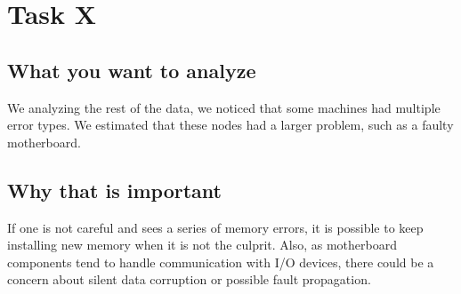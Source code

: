 \section{Task X}
\subsection{What you want to analyze}
We analyzing the rest of the data, we noticed that some machines had multiple
error types.  We estimated that these nodes had a larger problem, such as a
faulty motherboard.

\subsection{Why that is important}
If one is not careful and sees a series of memory errors, it is possible to keep
installing new memory when it is not the culprit.  Also, as motherboard
components tend to handle communication with I/O devices, there could be a
concern about silent data corruption or possible fault propagation. 


